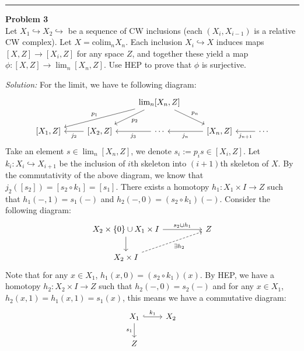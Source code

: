 \documentclass[a4paper, 12pt]{article}
\newenvironment{problem}[2][Problem]
    { \begin{mdframed}[backgroundcolor=gray!20] \textbf{#1 #2} \\}
    {  \end{mdframed}}
\newenvironment{solution}
    {\textit{Solution:}}
    {}
\newcommand{\colim}{\text{colim}}
\begin{document}
\noindent\rule{7in}{2.8pt}
\begin{problem}{3}
Let \(X_1\hookrightarrow X_2\hookrightarrow \) be a sequence of CW inclusions (each \((X_i,X_{i-1})\) is a relative CW complex). Let \(X=\colim_n X_n\). 
Each inclusion \(X_i\hookrightarrow X\) induces maps \([X,Z]\rightarrow [X_i,Z]\) for any space \(Z\), and together these yield a map \(\phi:[X,Z]\rightarrow \lim_n[X_n,Z]\). 
Use HEP to prove that \(\phi\) is surjective.
\end{problem}
\begin{solution}
For the limit, we have te following diagram:
\[\begin{tikzcd}
	&& {\lim_n[X_n,Z]} \\
	{[X_1,Z]} & {[X_2,Z]} & \cdots & {[X_n,Z]} & \cdots
	\arrow["{p_1}"', from=1-3, to=2-1]
	\arrow["{p_2}", from=1-3, to=2-2]
	\arrow["{p_n}", from=1-3, to=2-4]
	\arrow["{j_2}", from=2-2, to=2-1]
	\arrow["{j_3}", from=2-3, to=2-2]
	\arrow["{j_n}", from=2-4, to=2-3]
	\arrow["{j_{n+1}}", from=2-5, to=2-4]
\end{tikzcd}\]
Take an element \(s\in \lim_n[X_n,Z]\), we denote \(s_i:=p_is\in [X_i,Z]\). Let \(k_i:X_i\hookrightarrow X_{i+1}\) be the inclusion of \(i\)th skeleton into \((i+1)\)th skeleton of \(X\). By the commutativity 
of the above diagram, we know that \(j_2([s_2])=[s_2\circ k_1]=[s_1]\). There exists a homotopy \(h_1:X_1\times I\rightarrow Z\) such that \(h_1(-,1)=s_1(-)\) and \(h_2(-,0)=(s_2\circ k_1)(-)\). Consider the following diagram: 
\[\begin{tikzcd}
	{X_2\times\left\{0\right\}\cup X_1\times I} && Z \\
	{X_2\times I}
	\arrow["{s_2\cup h_1}", from=1-1, to=1-3]
	\arrow[from=1-1, to=2-1]
	\arrow["{\exists h_2}"', dashed, from=2-1, to=1-3]
\end{tikzcd}\]
Note that for any \(x\in X_1\), \(h_1(x,0)=(s_2\circ k_1)(x)\). By HEP, we have a homotopy \(h_2:X_2\times I\rightarrow Z\) such that \(h_2(-,0)=s_2(-)\) and for any \(x\in X_1\), \(h_2(x,1)=h_1(x,1)=s_1(x)\), this means we have a commutative diagram: 
\[\begin{tikzcd}
	{X_1} & {X_2} \\
	Z
	\arrow["{k_1}", hook, from=1-1, to=1-2]
	\arrow["{s_1}"', from=1-1, to=2-1]

\end{tikzcd}\]
\end{solution}
\end{document}
